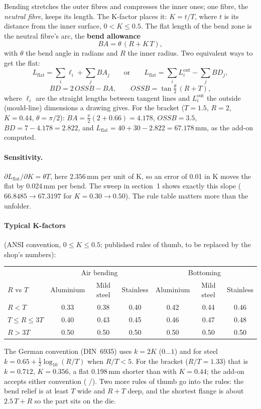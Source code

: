 Bending stretches the outer fibres and compresses the inner ones; one fibre, the \emph{neutral fibre}, keeps its length.
The K-factor places it: $K = t/T$, where $t$ is its distance from the inner surface, $0 < K \le 0.5$. The flat length of
the bend zone is the neutral fibre's arc, the \textbf{bend allowance}
\[
  \mathit{BA} = \theta\,(R + K\,T),
\]
with $\theta$ the bend angle in radians and $R$ the inner radius. Two equivalent ways to get the flat:
\[
  L_{\text{flat}} = \sum_i \ell_i + \sum_j \mathit{BA}_j
  \qquad\text{or}\qquad
  L_{\text{flat}} = \sum_i L_i^{\text{out}} - \sum_j \mathit{BD}_j ,
\]
\[
  \mathit{BD} = 2\,\mathit{OSSB} - \mathit{BA},\qquad \mathit{OSSB} = \tan\tfrac{\theta}{2}\,(R+T),
\]
where $\ell_i$ are the straight lengths between tangent lines and $L_i^{\text{out}}$ the outside (mould-line)
dimensions a drawing gives. For the bracket ($T=1.5$, $R=2$, $K=0.44$, $\theta=\pi/2$):
$\mathit{BA}=\tfrac{\pi}{2}(2+0.66)=4.178$, $\mathit{OSSB}=3.5$, $\mathit{BD}=7-4.178=2.822$, and
$L_{\text{flat}} = 40+30-2.822 = 67.178$\,mm, as the add-on computed.

\paragraph{Sensitivity.} $\partial L_{\text{flat}}/\partial K = \theta T$, here $2.356$\,mm per unit of K, so an error of
0.01 in K moves the flat by 0.024\,mm per bend. The sweep in section~1 shows exactly this slope
($66.8485 \rightarrow 67.3197$ for $K = 0.30 \rightarrow 0.50$). The rule table matters more than the unfolder.

\paragraph{Typical K-factors} (ANSI convention, $0 \le K \le 0.5$; published rules of thumb, to be replaced by the
shop's numbers):
\begin{center}
\small
\begin{tabular}{@{}lccc@{\qquad}ccc@{}}
\toprule
 & \multicolumn{3}{c}{Air bending} & \multicolumn{3}{c}{Bottoming}\\
$R$ vs $T$ & Aluminium & Mild steel & Stainless & Aluminium & Mild steel & Stainless\\
\midrule
$R < T$ & 0.33 & 0.38 & 0.40 & 0.42 & 0.44 & 0.46\\
$T \le R \le 3T$ & 0.40 & 0.43 & 0.45 & 0.46 & 0.47 & 0.48\\
$R > 3T$ & 0.50 & 0.50 & 0.50 & 0.50 & 0.50 & 0.50\\
\bottomrule
\end{tabular}
\end{center}
The German convention (DIN~6935) uses $k = 2K$ ($0\ldots1$) and for steel $k = 0.65 + \tfrac12\log_{10}(R/T)$ when
$R/T<5$. For the bracket ($R/T=1.33$) that is $k=0.712$, $K=0.356$, a flat 0.198\,mm shorter than with $K=0.44$; the
add-on accepts either convention ( /). Two more rules of thumb go into the
rules: the bend relief is at least $T$ wide and $R+T$ deep, and the shortest flange is about $2.5\,T + R$ so the
part sits on the die.


